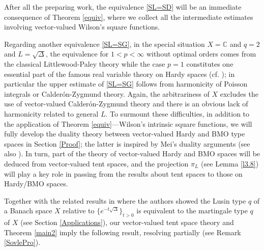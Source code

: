 \documentclass[oneside,english,a4wide]{amsart}
\numberwithin{equation}{section}
\numberwithin{figure}{section}
\theoremstyle{plain}
\theoremstyle{plain}
\newtheorem{corollary}[thm]{Corollary}
\theoremstyle{definition}
\theoremstyle{plain}
\theoremstyle{remark}
\theoremstyle{definition}
\theoremstyle{remark}
\theoremstyle{definition}
\newcommand{\real}{{\mathbb R}}
\newcommand{\8}{+\infty}
\renewcommand{\1}{\mathbbm{1}}
\begin{document}
After all the preparing work, the equivalence \eqref{SL=SD} will be an immediate consequence of Theorem \ref{equiv}, where we collect all the intermediate estimates involving vector-valued Wilson's square functions. 

Regarding another equivalence \eqref{SL=SG}, in the special situation $X=\mathbb C$ and $q=2$ and $L=\sqrt{\Delta}$, the equivalence for $1<p<\infty$ without optimal orders comes from the classical Littlewood-Paley theory while the case $p=1$ constitutes one essential part of the famous real variable theory on Hardy spaces (cf. {\cite{Fefferman1971BMO, Fefferman1971,Fefferman1972hp} }); in particular the upper estimate of \eqref{SL=SG} follows from harmonicity of Poisson integrals or Calder\'on-Zygmund theory. Again, the arbitrariness of $X$ excludes the use of vector-valued Calder\'on-Zygmund theory and there is an obvious lack of harmonicity related to general $L$. To surmount these difficulties, in addition to the application of Theorem \ref{equiv}---Wilson's intrinsic square functions, we will fully develop the duality theory between vector-valued Hardy and BMO type spaces in Section \ref{Proof}; the latter is inspired by Mei's duality arguments \cite{Mei2007} (see also \cite{Xia2016,Xu2022}). In turn, part of the theory of vector-valued Hardy and BMO spaces will be deduced from vector-valued tent spaces, and the projection $\pi_L$ (see Lemma \ref{l3.8}) will play a key role in passing from the results about tent spaces to those on Hardy/BMO spaces. 








Together with the related results in \cite{MTX, Ouyang2010} where the authors showed the Lusin {type} $q$ of a Banach space $X$ relative to $\{e^{-t\sqrt{\Delta}}\}_{t>0}$ is equivalent to the martingale type $q$ of $X$ {(see Section \ref{Applications})}, our vector-valued tent space theory and Theorem \ref{main2} imply the following result, resolving partially \cite[Problem 1.8, Problem A.1 and Conjecture A.4]{Xu2021} (see Remark \ref{SovlePro}).
\end{document}
